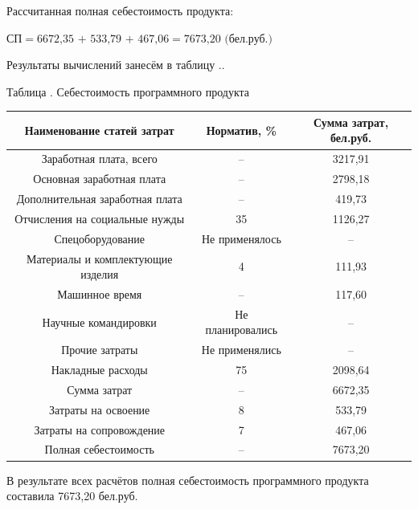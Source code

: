 {    \par \redline Рассчитанная полная себестоимость продукта:

    \formulaspace 
    \par \redline $\textrm{СП} = \textrm{6672,35 + 533,79 + 467,06} = \textrm{7673,20 (бел.руб.)}$
    \formulaspace 
    \par \redline Результаты вычислений занесём в таблицу \thechaptercntr .\thetablecntr.
    \topTablespace
    {\begin{Center}
        \par \gostFont Таблица \thechaptercntr .\thetablecntr \spc {--} Себестоимость программного продукта

        \renewcommand{\arraystretch}{1.4} %
        \begin{tabular}{|c|c|c|}
        \hline
        Наименование статей затрат & Норматив, \% & Сумма затрат, бел.руб. \\ \hline
        Заработная плата, всего & {--} & 3217,91 \\ \hline
        Основная заработная плата & {--} & 2798,18 \\ \hline
        Дополнительная заработная плата & {--} & 419,73 \\ \hline
        Отчисления на социальные нужды & 35 & 1126,27 \\ \hline
        Спецоборудование & Не применялось & {--} \\ \hline
        Материалы и комплектующие изделия & 4 & 111,93 \\ \hline
        Машинное время & {--} & 117,60 \\ \hline
        Научные командировки & Не планировались & {--} \\ \hline
        Прочие затраты & Не применялись & {--} \\ \hline
        Накладные расходы & 75 & 2098,64 \\ \hline
        Сумма затрат & {--} & 6672,35 \\ \hline
        Затраты на освоение & 8 & 533,79 \\ \hline
        Затраты на сопровождение & 7 & 467,06 \\ \hline
        Полная себестоимость & {--} & 7673,20 \\ \hline
        \end{tabular}
    \end{Center}}
    \botTablespace \addtocounter{tablecntr}{1}
    
    \par \redline В результате всех расчётов полная себестоимость программного продукта составила 7673,20 бел.руб. 
}

